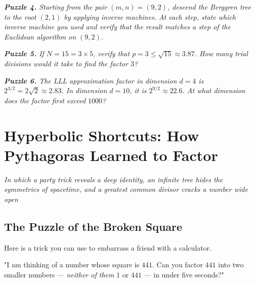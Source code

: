 \documentclass[11pt,openright,twoside]{book}
\renewenvironment{quotation}{%
  \par\vspace{8pt}%
  \begin{list}{}{%
    \setlength{\leftmargin}{2em}%
    \setlength{\rightmargin}{2em}%
  }\item[]\itshape\color{pullquote}%
}{%
  \end{list}%
  \par\vspace{8pt}%
}
\theoremstyle{definition}
\begin{document}
\begin{quotation}
\noindent\itshape \textbf{Puzzle 4.} Starting from the pair $(m, n) = (9, 2)$, descend the Berggren tree to the root $(2, 1)$ by applying inverse machines. At each step, state which inverse machine you used and verify that the result matches a step of the Euclidean algorithm on $(9, 2)$.
\end{quotation}

\begin{quotation}
\noindent\itshape \textbf{Puzzle 5.} If $N = 15 = 3 \times 5$, verify that $p = 3 \le \sqrt{15} \approx 3.87$. How many trial divisions would it take to find the factor $3$?
\end{quotation}

\begin{quotation}
\noindent\itshape \textbf{Puzzle 6.} The LLL approximation factor in dimension $d = 4$ is $2^{3/2} = 2\sqrt{2} \approx 2.83$. In dimension $d = 10$, it is $2^{9/2} \approx 22.6$. At what dimension does the factor first exceed $1000$?
\end{quotation}

\clearpage


\chapter{Hyperbolic Shortcuts: How Pythagoras Learned to Factor}
\label{ch:3}

\begin{center}
\textit{In which a party trick reveals a deep identity, an infinite tree hides the symmetries of spacetime, and a greatest common divisor cracks a number wide open}
\end{center}
\bigskip




\bigskip


\section{The Puzzle of the Broken Square}

Here is a trick you can use to embarrass a friend with a calculator.

"I am thinking of a number whose square is $441$. Can you factor $441$ into two smaller numbers --- \textit{neither of them} $1$ or $441$ --- in under five seconds?"
\end{document}
